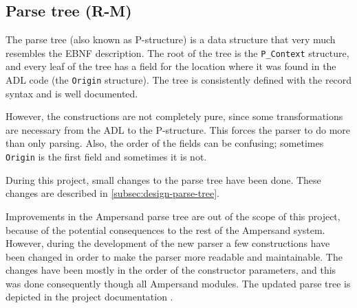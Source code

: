 
\subsection{Parse tree (R-M)}
\label{subsec:analysis-parse-tree}
The parse tree (also known as P-structure) is a data structure that very much resembles the EBNF description.
The root of the tree is the \texttt{P\_Context} structure, and every leaf of the tree has a field for the location where it was found in the ADL code (the \texttt{Origin} structure).
The tree is consistently defined with the record syntax and is well documented.

However, the constructions are not completely pure, since some transformations are necessary from the ADL to the P-structure.
This forces the parser to do more than only parsing.
Also, the order of the fields can be confusing; sometimes \texttt{Origin} is the first field and sometimes it is not.

During this project, small changes to the parse tree have been done.
These changes are described in \autoref{subsec:design-parse-tree}.

\label{subsec:design-parse-tree}
Improvements in the Ampersand parse tree are out of the scope of this project, because of the potential consequences to the rest of the Ampersand system.
However, during the development of the new parser a few constructions have been changed in order to make the parser more readable and maintainable.
The changes have been mostly in the order of the constructor parameters, and this was done consequently though all Ampersand modules.
The updated parse tree is depicted in the project documentation .

